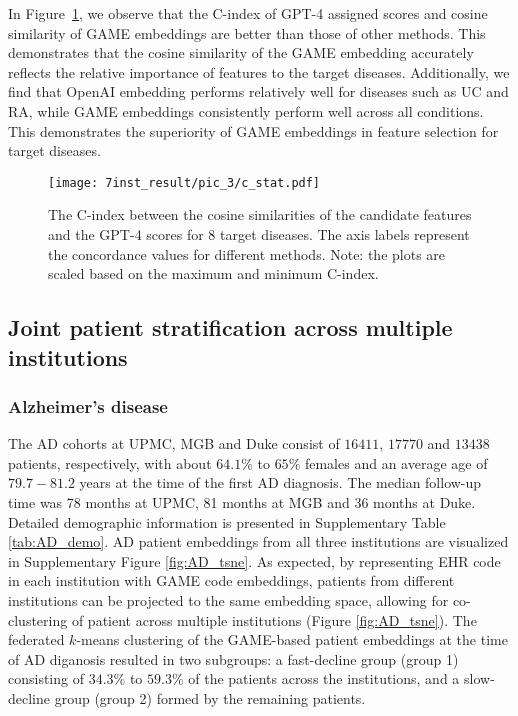 \documentclass{article}
\begin{document}
In Figure~\ref{P3_}, we observe that the C-index of GPT-4 assigned scores and cosine similarity of GAME embeddings are better than those of other methods. This demonstrates that the cosine similarity of the GAME embedding accurately reflects the relative importance of features to the target diseases. Additionally, we find that OpenAI embedding performs relatively well for diseases such as UC and RA, while GAME embeddings consistently perform well across all conditions. This demonstrates the superiority of GAME embeddings in feature selection for target diseases.

\begin{figure}[!htbp]%
    \centering
    \texttt{[image: 7inst\_result/pic\_3/c\_stat.pdf]}
    \caption{The C-index between the cosine similarities of the candidate features and the GPT-4 scores for 8 target diseases. The axis labels represent the concordance values for different methods. Note: the plots are scaled based on the maximum and minimum C-index.}
    \label{P3_}
\end{figure}



\subsection{Joint patient stratification across multiple institutions}

\subsubsection{Alzheimer's disease}
The AD cohorts at UPMC, MGB and Duke consist of $16411$, $17770$ and $13438$ patients, respectively, with about $64.1\%$ to $65\%$ females and an average age of $79.7-81.2$ years at the time of the first AD diagnosis. The median follow-up time was 78 months at UPMC, 81 months at MGB and 36 months at Duke. Detailed demographic information is presented in Supplementary Table \ref{tab:AD_demo}. AD patient embeddings from all three institutions are visualized in Supplementary Figure \ref{fig:AD_tsne}. As expected, by representing EHR code in each institution with GAME code embeddings, patients from different institutions can be projected to the same embedding space, allowing for co-clustering of patient across multiple institutions (Figure \ref{fig:AD_tsne}). The federated $k$-means clustering of the GAME-based patient embeddings at the time of AD diganosis resulted in two subgroups: a fast-decline group (group 1) consisting of $34.3\%$ to $59.3\%$ of the patients across the institutions, and a slow-decline group (group 2) formed by the remaining patients.
\end{document}
